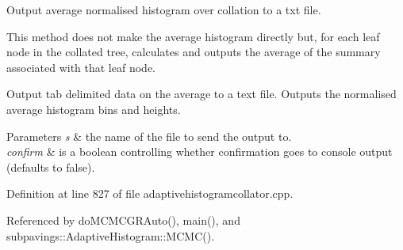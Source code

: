 \-Output average normalised histogram over collation to a txt file. 

\-This method does not make the average histogram directly but, for each leaf node in the collated tree, calculates and outputs the average of the summary associated with that leaf node.

\-Output tab delimited data on the average to a text file. \-Outputs the normalised average histogram bins and heights.


\begin{DoxyParams}{\-Parameters}
{\em s} & the name of the file to send the output to. \\
\hline
{\em confirm} & is a boolean controlling whether confirmation goes to console output (defaults to false). \\
\hline
\end{DoxyParams}


\-Definition at line 827 of file adaptivehistogramcollator.\-cpp.



\-Referenced by do\-M\-C\-M\-C\-G\-R\-Auto(), main(), and subpavings\-::\-Adaptive\-Histogram\-::\-M\-C\-M\-C().


